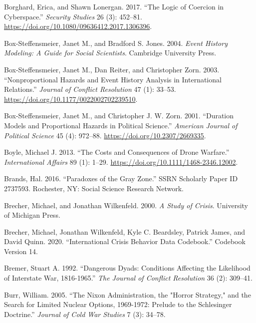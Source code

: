 \documentclass[
]{article}
\begin{document}
\leavevmode\hypertarget{ref-borghard_logiccoercioncyberspace_2017}{}%
Borghard, Erica, and Shawn Lonergan. 2017. ``The Logic of Coercion in Cyberspace.'' \emph{Security Studies} 26 (3): 452--81. \url{https://doi.org/10.1080/09636412.2017.1306396}.

\leavevmode\hypertarget{ref-box-steffensmeier_eventhistorymodeling_2004}{}%
Box-Steffensmeier, Janet M., and Bradford S. Jones. 2004. \emph{Event History Modeling: A Guide for Social Scientists}. Cambridge University Press.

\leavevmode\hypertarget{ref-box-steffensmeier_nonproportionalhazardsevent_2003}{}%
Box-Steffensmeier, Janet M., Dan Reiter, and Christopher Zorn. 2003. ``Nonproportional Hazards and Event History Analysis in International Relations.'' \emph{Journal of Conflict Resolution} 47 (1): 33--53. \url{https://doi.org/10.1177/0022002702239510}.

\leavevmode\hypertarget{ref-box-steffensmeier_durationmodelsproportional_2001}{}%
Box-Steffensmeier, Janet M., and Christopher J. W. Zorn. 2001. ``Duration Models and Proportional Hazards in Political Science.'' \emph{American Journal of Political Science} 45 (4): 972--88. \url{https://doi.org/10.2307/2669335}.

\leavevmode\hypertarget{ref-boyle_costsconsequencesdrone_2013}{}%
Boyle, Michael J. 2013. ``The Costs and Consequences of Drone Warfare.'' \emph{International Affairs} 89 (1): 1--29. \url{https://doi.org/10.1111/1468-2346.12002}.

\leavevmode\hypertarget{ref-brands_paradoxesgrayzone_2016}{}%
Brands, Hal. 2016. ``Paradoxes of the Gray Zone.'' SSRN Scholarly Paper ID 2737593. Rochester, NY: Social Science Research Network.

\leavevmode\hypertarget{ref-brecher_studycrisis_2000}{}%
Brecher, Michael, and Jonathan Wilkenfeld. 2000. \emph{A Study of Crisis}. University of Michigan Press.

\leavevmode\hypertarget{ref-brecher_internationalcrisisbehavior_2020}{}%
Brecher, Michael, Jonathan Wilkenfeld, Kyle C. Beardsley, Patrick James, and David Quinn. 2020. ``International Crisis Behavior Data Codebook.'' Codebook Version 14.

\leavevmode\hypertarget{ref-bremer_dangerousdyadsconditions_1992}{}%
Bremer, Stuart A. 1992. ``Dangerous Dyads: Conditions Affecting the Likelihood of Interstate War, 1816-1965.'' \emph{The Journal of Conflict Resolution} 36 (2): 309--41.

\leavevmode\hypertarget{ref-burr_nixonadministrationhorror_2005}{}%
Burr, William. 2005. ``The Nixon Administration, the "Horror Strategy," and the Search for Limited Nuclear Options, 1969-1972: Prelude to the Schlesinger Doctrine.'' \emph{Journal of Cold War Studies} 7 (3): 34--78.
\end{document}
